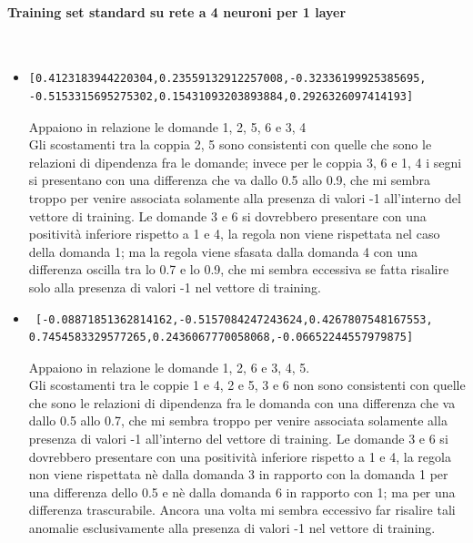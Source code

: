 \paragraph{Training set standard su rete a 4 neuroni per 1 layer}\mbox{}
\label{Training set standard su rete a 4 neuroni per 1 layer}
\\
\noindent
\begin{itemize}
\item \begin{verbatim}[0.4123183944220304,0.23559132912257008,-0.32336199925385695,
-0.5153315695275302,0.15431093203893884,0.2926326097414193]
\end{verbatim}
Appaiono in relazione le domande 1, 2, 5, 6 e 3, 4\\
Gli scostamenti tra la coppia 2, 5 sono consistenti con quelle che sono le relazioni di dipendenza fra le domande; invece per le coppia 3, 6 e 1, 4 i segni si presentano con una differenza che va dallo 0.5 allo 0.9, che mi sembra troppo per venire associata solamente alla presenza di valori -1 all'interno del vettore di training. 
Le domande 3 e 6 si dovrebbero presentare con una positivit\`a inferiore rispetto a 1 e 4, la regola non viene rispettata nel caso della domanda 1; ma la regola viene sfasata dalla domanda 4 con una differenza oscilla tra lo 0.7 e lo 0.9, che mi sembra eccessiva se fatta risalire solo alla presenza di valori -1 nel vettore di training.

\item \begin{verbatim} [-0.08871851362814162,-0.5157084247243624,0.4267807548167553,
0.7454583329577265,0.2436067770058068,-0.06652244557979875]
\end{verbatim}
Appaiono in relazione le domande 1, 2, 6 e  3, 4, 5.\\
Gli scostamenti tra le coppie 1 e 4, 2 e 5, 3 e 6 non sono consistenti con quelle che sono le relazioni di dipendenza fra le domanda con una differenza che va dallo 0.5 allo 0.7, che mi sembra troppo per venire associata solamente alla presenza di valori -1 all'interno del vettore di training.
Le domande 3 e 6 si dovrebbero presentare con una positivit\`a inferiore rispetto a 1 e 4, la regola non viene rispettata  n\`e dalla domanda 3 in rapporto con la domanda 1 per una differenza dello 0.5 e n\`e dalla domanda 6 in rapporto con 1; ma per una differenza trascurabile. Ancora una volta mi sembra eccessivo far risalire tali anomalie esclusivamente alla presenza di valori -1 nel vettore di training.


\end{itemize}
